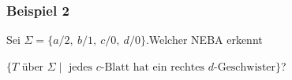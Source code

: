     \begin{frame}
      \frametitle{Beispiel 2}

      Sei $\Sigma = \{a/2,~ b/1,~ c/0,~ d/0\}$.\quad Welcher NEBA erkennt
      \par\smallskip
      $\{T \text{~über~} \Sigma \mid \text{~jedes $c$-Blatt hat ein rechtes $d$-Geschwister}\}$?

      \par\bigskip
        

\end{frame}
